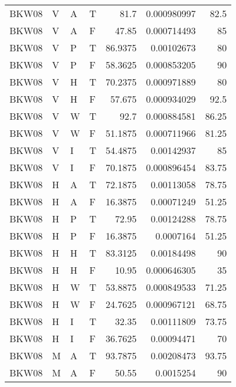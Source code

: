 \begin{longtable}{llllrrr}
    BKW08    & V     & A     & T          & 81.7       & 0.000980997 & 82.5     \\
    BKW08    & V     & A     & F          & 47.85      & 0.000714493 & 85       \\
    BKW08    & V     & P     & T          & 86.9375    & 0.00102673  & 80       \\
    BKW08    & V     & P     & F          & 58.3625    & 0.000853205 & 90       \\
    BKW08    & V     & H     & T          & 70.2375    & 0.000971889 & 80       \\
    BKW08    & V     & H     & F          & 57.675     & 0.000934029 & 92.5     \\
    BKW08    & V     & W     & T          & 92.7       & 0.000884581 & 86.25    \\
    BKW08    & V     & W     & F          & 51.1875    & 0.000711966 & 81.25    \\
    BKW08    & V     & I     & T          & 54.4875    & 0.00142937  & 85       \\
    BKW08    & V     & I     & F          & 70.1875    & 0.000896454 & 83.75    \\
    BKW08    & H     & A     & T          & 72.1875    & 0.00113058  & 78.75    \\
    BKW08    & H     & A     & F          & 16.3875    & 0.00071249  & 51.25    \\
    BKW08    & H     & P     & T          & 72.95      & 0.00124288  & 78.75    \\
    BKW08    & H     & P     & F          & 16.3875    & 0.0007164   & 51.25    \\
    BKW08    & H     & H     & T          & 83.3125    & 0.00184498  & 90       \\
    BKW08    & H     & H     & F          & 10.95      & 0.000646305 & 35       \\
    BKW08    & H     & W     & T          & 53.8875    & 0.000849533 & 71.25    \\
    BKW08    & H     & W     & F          & 24.7625    & 0.000967121 & 68.75    \\
    BKW08    & H     & I     & T          & 32.35      & 0.00111809  & 73.75    \\
    BKW08    & H     & I     & F          & 36.7625    & 0.00094471  & 70       \\
    BKW08    & M     & A     & T          & 93.7875    & 0.00208473  & 93.75    \\
    BKW08    & M     & A     & F          & 50.55      & 0.0015254   & 90       \\

\end{longtable}

